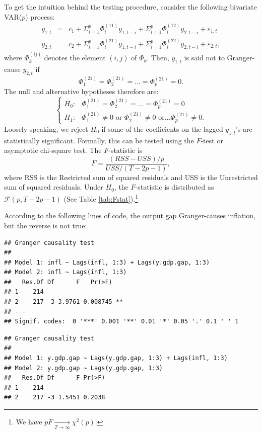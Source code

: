 \documentclass[
  11pt,
]{book}
\theoremstyle{definition}
\theoremstyle{definition}
\theoremstyle{definition}
\theoremstyle{definition}
\theoremstyle{remark}
\begin{document}
To get the intuition behind the testing procedure, consider the following
bivariate VAR(\(p\)) process:
\begin{eqnarray*}
y_{1,t} & = & c_1+\Sigma_{i=1}^{p}\Phi_i^{(11)}y_{1,t-i}+\Sigma_{i=1}^{p}\Phi_i^{(12)}y_{2,t-i}+\varepsilon_{1,t}\\
y_{2,t} & = & c_2+\Sigma_{i=1}^{p}\Phi_i^{(21)}y_{1,t-i}+\Sigma_{i=1}^{p}\Phi_i^{(22)}y_{2,t-i}+\varepsilon_{2,t},
\end{eqnarray*}
where \(\Phi_k^{(ij)}\) denotes the element \((i,j)\) of \(\Phi_k\). Then, \(y_{1,t}\) is said not to Granger-cause \(y_{2,t}\) if
\[
\Phi_1^{(21)}=\Phi_2^{(21)}=\ldots=\Phi_p^{(21)}=0.
\]
The null and alternative hypotheses therefore are:
\[
\begin{cases}
H_{0}: & \Phi_1^{(21)}=\Phi_2^{(21)}=\ldots=\Phi_p^{(21)}=0\\
H_{1}: & \Phi_1^{(21)}\neq0\mbox{ or }\Phi_2^{(21)}\neq0\mbox{ or}\ldots\Phi_p^{(21)}\neq0.\end{cases}
\]
Loosely speaking, we reject \(H_{0}\) if some of the coefficients on the lagged \(y_{1,t}\)'s are statistically significant. Formally, this can be tested using the \(F\)-test or asymptotic chi-square test. The \(F\)-statistic is
\[
F=\frac{(RSS-USS)/p}{USS/(T-2p-1)},
\]
where RSS is the Restricted sum of squared residuals and USS is the Unrestricted sum of squared residuals. Under \(H_{0}\), the \(F\)-statistic is distributed as \(\mathcal{F}(p,T-2p-1)\) (See Table \ref{tab:Fstat}).\footnote{We have \(pF\underset{T \rightarrow \infty}{\rightarrow}\chi^{2}(p)\).}

According to the following lines of code, the output gap Granger-causes inflation, but the reverse is not true:

\begin{verbatim}
## Granger causality test
## 
## Model 1: infl ~ Lags(infl, 1:3) + Lags(y.gdp.gap, 1:3)
## Model 2: infl ~ Lags(infl, 1:3)
##   Res.Df Df      F   Pr(>F)   
## 1    214                      
## 2    217 -3 3.9761 0.008745 **
## ---
## Signif. codes:  0 '***' 0.001 '**' 0.01 '*' 0.05 '.' 0.1 ' ' 1
\end{verbatim}

\begin{verbatim}
## Granger causality test
## 
## Model 1: y.gdp.gap ~ Lags(y.gdp.gap, 1:3) + Lags(infl, 1:3)
## Model 2: y.gdp.gap ~ Lags(y.gdp.gap, 1:3)
##   Res.Df Df      F Pr(>F)
## 1    214                 
## 2    217 -3 1.5451 0.2038
\end{verbatim}
\end{document}
